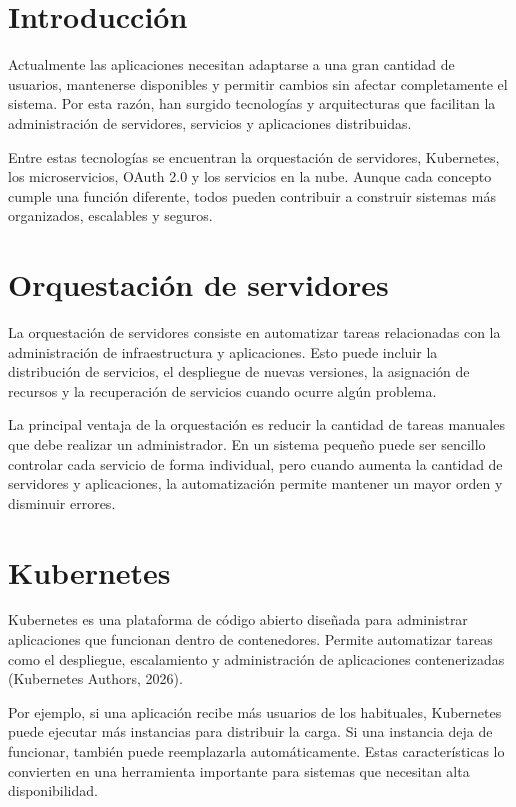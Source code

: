 \documentclass[12pt,letterpaper]{article}
\begin{document}
\section*{Introducción}

Actualmente las aplicaciones necesitan adaptarse a una gran cantidad de usuarios, mantenerse disponibles y permitir cambios sin afectar completamente el sistema. Por esta razón, han surgido tecnologías y arquitecturas que facilitan la administración de servidores, servicios y aplicaciones distribuidas.

Entre estas tecnologías se encuentran la orquestación de servidores, Kubernetes, los microservicios, OAuth 2.0 y los servicios en la nube. Aunque cada concepto cumple una función diferente, todos pueden contribuir a construir sistemas más organizados, escalables y seguros.

\section*{Orquestación de servidores}

La orquestación de servidores consiste en automatizar tareas relacionadas con la administración de infraestructura y aplicaciones. Esto puede incluir la distribución de servicios, el despliegue de nuevas versiones, la asignación de recursos y la recuperación de servicios cuando ocurre algún problema.

La principal ventaja de la orquestación es reducir la cantidad de tareas manuales que debe realizar un administrador. En un sistema pequeño puede ser sencillo controlar cada servicio de forma individual, pero cuando aumenta la cantidad de servidores y aplicaciones, la automatización permite mantener un mayor orden y disminuir errores.

\section*{Kubernetes}

Kubernetes es una plataforma de código abierto diseñada para administrar aplicaciones que funcionan dentro de contenedores. Permite automatizar tareas como el despliegue, escalamiento y administración de aplicaciones contenerizadas (Kubernetes Authors, 2026).

Por ejemplo, si una aplicación recibe más usuarios de los habituales, Kubernetes puede ejecutar más instancias para distribuir la carga. Si una instancia deja de funcionar, también puede reemplazarla automáticamente. Estas características lo convierten en una herramienta importante para sistemas que necesitan alta disponibilidad.
\end{document}
